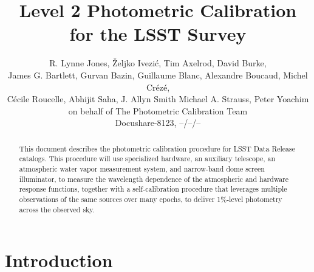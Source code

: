 \documentclass[12pt,preprint]{aastex}
\begin{document}
\title{Level 2 Photometric Calibration for the LSST Survey}

\author{
R. Lynne Jones, {\v Z}eljko Ivezi{\'c},  Tim Axelrod, David Burke, \\
James G. Bartlett, 
Gurvan Bazin,
Guillaume Blanc,
Alexandre Boucaud, 
Michel Cr{\'e}z{\'e}, \\ 
C{\'e}cile Roucelle, 
Abhijit Saha, 
J. Allyn Smith
Michael A. Strauss,
Peter Yoachim \\
on behalf of 
The Photometric Calibration Team \\ 
Docushare-8123, --/--/-- \\
}



\begin{abstract}
This document describes the photometric calibration procedure for LSST
Data Release catalogs. This procedure will use specialized hardware, 
an auxiliary telescope, an atmospheric water vapor measurement system, and narrow-band dome screen illuminator, to
measure the wavelength dependence of the atmospheric and hardware
response functions, together with a self-calibration procedure that
leverages multiple observations of the same sources over many epochs,
to deliver 1\%-level photometry across the observed sky.
\end{abstract}

\tableofcontents

\section{Introduction}
\end{document}
